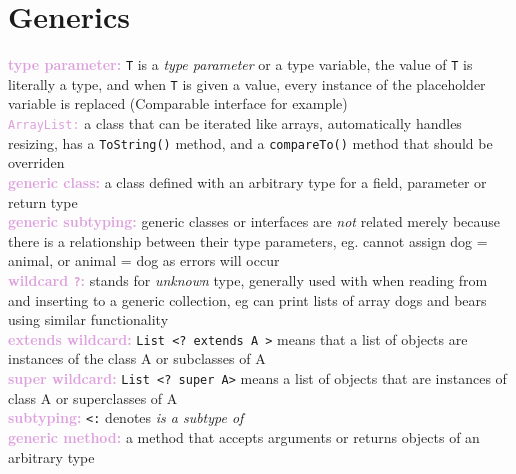 \documentclass[a4paper,10pt]{article}
\begin{document}
\section{Generics}
\textcolor{Plum}{\textbf{type parameter: }} \texttt{T} is a \emph{type parameter} or a type variable, the value of \texttt{T} is literally a type, and when \texttt{T} is given a value, every instance of the placeholder variable is replaced (Comparable interface for example)\\
\textcolor{Plum}{\texttt{ArrayList:}} a class that can be iterated like arrays, automatically handles resizing, has a \texttt{ToString()} method, and a \texttt{compareTo()} method that should be overriden\\
\textcolor{Plum}{\textbf{generic class:}} a class defined with an arbitrary type for a field, parameter or return type\\
\textcolor{Plum}{\textbf{generic subtyping:}} generic classes or interfaces are \emph{not} related merely because there is a relationship between their type parameters, eg. cannot assign dog = animal, or animal = dog as errors will occur\\
\textcolor{Plum}{\textbf{wildcard \texttt{?}:}} stands for \emph{unknown} type, generally used with when reading from and inserting to a generic collection, eg can print lists of array dogs and bears using similar functionality\\
\textcolor{Plum}{\textbf{extends wildcard:}} \texttt{List <? extends A >} means that a list of objects are instances of the class A or subclasses of A\\
\textcolor{Plum}{\textbf{super wildcard:}} \texttt{List <? super A>} means a list of objects that are instances of class A or superclasses of A\\
\textcolor{Plum}{\textbf{subtyping:}} \texttt{<:} denotes \emph{is a subtype of}\\
\textcolor{Plum}{\textbf{generic method:}} a method that accepts arguments or returns objects of an arbitrary type\\
\end{document}
